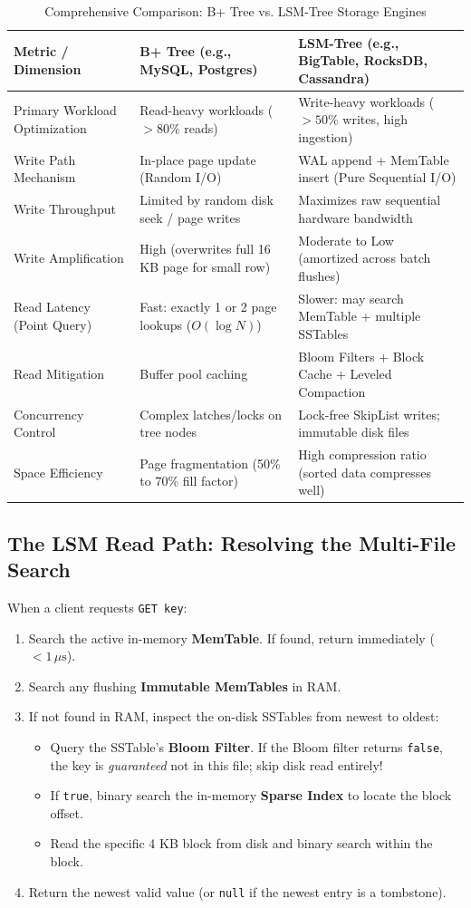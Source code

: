 \documentclass[10pt,journal,compsoc,onecolumn]{IEEEtran}
\begin{document}
\begin{table}[htbp]
\caption{Comprehensive Comparison: B+ Tree vs. LSM-Tree Storage Engines}
\label{tab:btree_vs_lsm}
\centering
\begin{tabular}{lll}
\toprule
\textbf{Metric / Dimension} & \textbf{B+ Tree (e.g., MySQL, Postgres)} & \textbf{LSM-Tree (e.g., BigTable, RocksDB, Cassandra)} \\
\midrule
Primary Workload Optimization & Read-heavy workloads ($>80\%$ reads) & Write-heavy workloads ($>50\%$ writes, high ingestion) \\
Write Path Mechanism & In-place page update (Random I/O) & WAL append + MemTable insert (Pure Sequential I/O) \\
Write Throughput & Limited by random disk seek / page writes & Maximizes raw sequential hardware bandwidth \\
Write Amplification & High (overwrites full 16 KB page for small row) & Moderate to Low (amortized across batch flushes) \\
Read Latency (Point Query) & Fast: exactly 1 or 2 page lookups ($O(\log N)$) & Slower: may search MemTable + multiple SSTables \\
Read Mitigation & Buffer pool caching & Bloom Filters + Block Cache + Leveled Compaction \\
Concurrency Control & Complex latches/locks on tree nodes & Lock-free SkipList writes; immutable disk files \\
Space Efficiency & Page fragmentation (50\% to 70\% fill factor) & High compression ratio (sorted data compresses well) \\
\bottomrule
\end{tabular}
\end{table}

\subsection{The LSM Read Path: Resolving the Multi-File Search}
When a client requests \texttt{GET key}:
\begin{enumerate}
    \item Search the active in-memory \textbf{MemTable}. If found, return immediately ($< 1\,\mu\text{s}$).
    \item Search any flushing \textbf{Immutable MemTables} in RAM.
    \item If not found in RAM, inspect the on-disk SSTables from newest to oldest:
    \begin{itemize}
        \item Query the SSTable's \textbf{Bloom Filter}. If the Bloom filter returns \texttt{false}, the key is \emph{guaranteed} not in this file; skip disk read entirely!
        \item If \texttt{true}, binary search the in-memory \textbf{Sparse Index} to locate the block offset.
        \item Read the specific 4 KB block from disk and binary search within the block.
    \end{itemize}
    \item Return the newest valid value (or \texttt{null} if the newest entry is a tombstone).
\end{enumerate}
\end{document}
